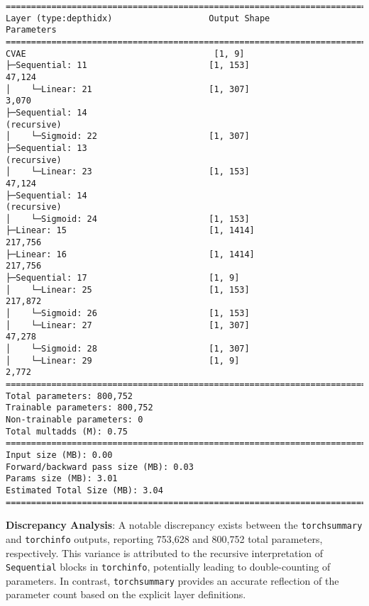 \documentclass[10pt]{article}
\begin{document}
\begin{verbatim}
==========================================================================================
Layer (type:depthidx)                   Output Shape              Parameters 
==========================================================================================
CVAE                                     [1, 9]                    
├─Sequential: 11                        [1, 153]                  47,124
│    └─Linear: 21                       [1, 307]                  3,070
├─Sequential: 14                                                (recursive)
│    └─Sigmoid: 22                      [1, 307]                  
├─Sequential: 13                                                (recursive)
│    └─Linear: 23                       [1, 153]                  47,124
├─Sequential: 14                                                (recursive)
│    └─Sigmoid: 24                      [1, 153]                  
├─Linear: 15                            [1, 1414]                 217,756
├─Linear: 16                            [1, 1414]                 217,756
├─Sequential: 17                        [1, 9]                    
│    └─Linear: 25                       [1, 153]                  217,872
│    └─Sigmoid: 26                      [1, 153]                  
│    └─Linear: 27                       [1, 307]                  47,278
│    └─Sigmoid: 28                      [1, 307]                  
│    └─Linear: 29                       [1, 9]                    2,772
==========================================================================================
Total parameters: 800,752
Trainable parameters: 800,752
Non-trainable parameters: 0
Total multadds (M): 0.75
==========================================================================================
Input size (MB): 0.00
Forward/backward pass size (MB): 0.03
Params size (MB): 3.01
Estimated Total Size (MB): 3.04
=========================================================================================
\end{verbatim}

\textbf{Discrepancy Analysis}: A notable discrepancy exists between the \texttt{torchsummary} and \texttt{torchinfo} outputs, reporting 753,628 and 800,752 total parameters, respectively. This variance is attributed to the recursive interpretation of \texttt{Sequential} blocks in \texttt{torchinfo}, potentially leading to double-counting of parameters. In contrast, \texttt{torchsummary} provides an accurate reflection of the parameter count based on the explicit layer definitions.
\end{document}
